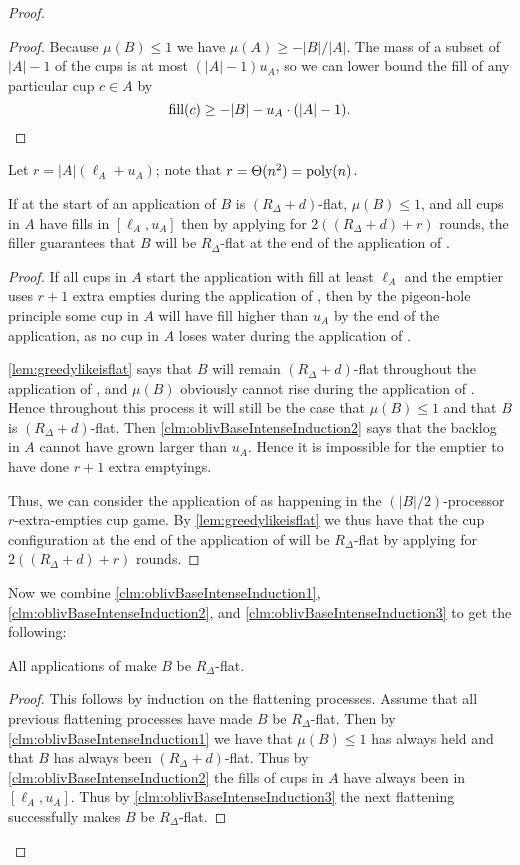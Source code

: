 \begin{proof}
\begin{proof}
  Because $\mu(B) \le 1$ we have $\mu(A) \ge -|B|/|A|$. The mass
  of a subset of $|A|-1$ of the cups is at most $(|A|-1)u_A$, so
  we can lower bound the fill of any particular cup $c \in A$ by 
  $$\operatorname{\textnormal{fill}}(c) \ge -|B| -u_A \cdot (|A| -1).$$
\end{proof}

Let $r = |A|(\ell_A + u_A)$; note that $r = \Theta(n^2) =
\operatorname{\text{poly}}(n)$.
\begin{clm}
  \label{clm:oblivBaseIntenseInduction3}
  If at the start of an application of \flatalg $B$ is $(R_\Delta
  + d)$-flat, $\mu(B) \le 1$, and all cups in $A$ have fills in
  $[\ell_A, u_A]$ then by applying \flatalg for $2((R_\Delta + d)
  + r)$ rounds, the filler guarantees that $B$ will be
  $R_\Delta$-flat at the end of the application of \flatalg. 
\end{clm}
\begin{proof}
  If all cups in $A$ start the application with fill at
  least $\ell_A$ and the emptier uses $r+1$ extra
  empties during the application of \flatalg, then by the
  pigeon-hole principle some cup in $A$
  will have fill higher than $u_A$ by the end of the application,
  as no cup in $A$ loses water during the application of \flatalg.
  
  \cref{lem:greedylikeisflat} says that $B$ will remain
  $(R_\Delta + d)$-flat throughout the application of \flatalg,
  and $\mu(B)$ obviously cannot rise during the application of
  \flatalg. Hence throughout this process it will still be the
  case that $\mu(B) \le 1$ and that $B$ is $(R_\Delta + d)$-flat.
  Then \cref{clm:oblivBaseIntenseInduction2} says that the
  backlog in $A$ cannot have grown larger than $u_A$. Hence it is
  impossible for the emptier to have done $r+1$ extra emptyings.

  Thus, we can consider the application of \flatalg as happening
  in the $(|B|/2)$-processor $r$-extra-empties cup game. By
  \cref{lem:greedylikeisflat} we thus have that the cup
  configuration at the end of the application of \flatalg will be
  $R_\Delta$-flat by applying \flatalg for $2((R_\Delta + d) +
  r)$ rounds.
\end{proof}

Now we combine \cref{clm:oblivBaseIntenseInduction1},
\cref{clm:oblivBaseIntenseInduction2}, and
\cref{clm:oblivBaseIntenseInduction3} to get the following:
\begin{clm}
  \label{clm:flatteningAlwaysWorks}
  All applications of \flatalg make $B$ be $R_\Delta$-flat.
 \end{clm}
\begin{proof}
  This follows by induction on the flattening processes. Assume
  that all previous flattening processes have made $B$ be
  $R_\Delta$-flat. Then by
  \cref{clm:oblivBaseIntenseInduction1} we have that $\mu(B) \le
  1$ has always held and that $B$ has always been $(R_\Delta +
  d)$-flat. Thus by \cref{clm:oblivBaseIntenseInduction2} the
  fills of cups in $A$ have always been in $[\ell_A, u_A]$. Thus
  by \cref{clm:oblivBaseIntenseInduction3} the next flattening
  successfully makes $B$ be $R_\Delta$-flat.


\end{proof}
\end{proof}
